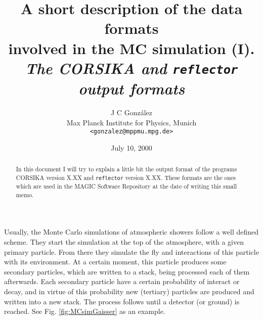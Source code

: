 \documentclass[12pt]{article}
\def\CORSIKA{\textsf{CORSIKA}\xspace}
\def\MonteCarlo{Monte Carlo\xspace}         %
\def\MC{\MonteCarlo}                        %
\begin{document}
\title{A short description of the data formats \\
involved in the MC simulation (I).\\
{\slshape The \CORSIKA and \texttt{reflector} output formats}}
\author{J C Gonz\'alez\\
Max Planck Institute for Physics, Munich\\ 
\texttt{<gonzalez@mppmu.mpg.de>}}
\date{July 10, 2000}

\maketitle

\begin{abstract}
  In this document I will try to explain a little bit the output
  format of the programs \CORSIKA version X.XX and \texttt{reflector}
  version X.XX. These formats are the ones which are used in the MAGIC
  Software Repository at the date of writing this small memo.\\
\end{abstract}

\thetableofcontents

\newpage


\label{chapter:simshowers}

Usually, the \MC simulations of atmospheric showers follow a well
defined scheme. They start the simulation at the top of the
atmosphere, with a given primary particle. From there they simulate
the fly and interactions of this particle with its environment. At a
certain moment, this particle produces some secondary particles, which
are written to a stack, being processed each of them afterwards. Each
secondary particle have a certain probability of interact or decay,
and in virtue of this probability new (tertiary) particles are
produced and written into a new stack. The process follows until a
detector (or ground) is reached. See Fig. \ref{fig:MCsimGaisser} as an
example.
\end{document}
